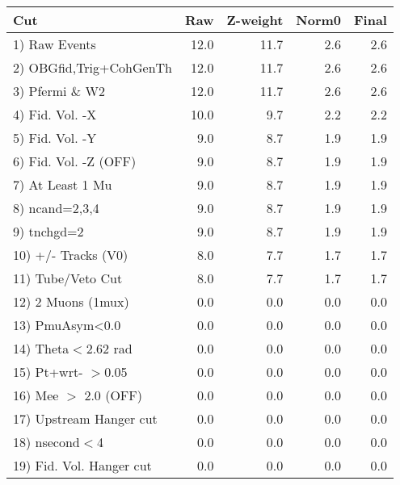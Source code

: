  \begin{table}[h!]\centering
 \begin{tabular}{||l||r|r|r|r||}
 \hline
 \hline
 Cut & Raw & Z-weight & Norm0 & Final \\
 \hline
  1) Raw Events           &        12.0 &        11.7 &         2.6 &         2.6 \\
  2) OBGfid,Trig+CohGenTh &        12.0 &        11.7 &         2.6 &         2.6 \\
  3) Pfermi \& W2         &        12.0 &        11.7 &         2.6 &         2.6 \\
  4) Fid. Vol. -X         &        10.0 &         9.7 &         2.2 &         2.2 \\
  5) Fid. Vol. -Y         &         9.0 &         8.7 &         1.9 &         1.9 \\
  6) Fid. Vol. -Z (OFF)   &         9.0 &         8.7 &         1.9 &         1.9 \\
  7) At Least 1 Mu        &         9.0 &         8.7 &         1.9 &         1.9 \\
  8) ncand=2,3,4          &         9.0 &         8.7 &         1.9 &         1.9 \\
  9) tnchgd=2             &         9.0 &         8.7 &         1.9 &         1.9 \\
 10) +/- Tracks (V0)      &         8.0 &         7.7 &         1.7 &         1.7 \\
 11) Tube/Veto Cut        &         8.0 &         7.7 &         1.7 &         1.7 \\
 12) 2 Muons (1mux)       &         0.0 &         0.0 &         0.0 &         0.0 \\
 13) PmuAsym<0.0          &         0.0 &         0.0 &         0.0 &         0.0 \\
 14) Theta$<$2.62 rad     &         0.0 &         0.0 &         0.0 &         0.0 \\
 15) Pt+wrt- $>$0.05      &         0.0 &         0.0 &         0.0 &         0.0 \\
 16) Mee $>$ 2.0  (OFF)   &         0.0 &         0.0 &         0.0 &         0.0 \\
 17) Upstream Hanger cut  &         0.0 &         0.0 &         0.0 &         0.0 \\
 18) nsecond$<$4          &         0.0 &         0.0 &         0.0 &         0.0 \\
 19) Fid. Vol. Hanger cut &         0.0 &         0.0 &         0.0 &         0.0 \\

\end{tabular}
\end{table}
